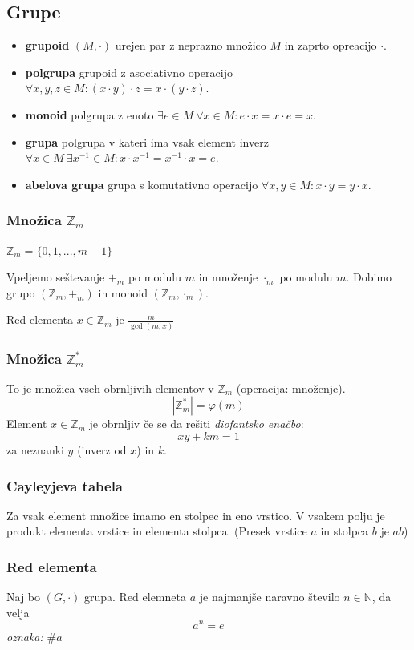 \begin{multicols}{4}
\subsection*{Grupe}
\begin{itemize}
    \item \textbf{grupoid} $(M, \cdot)$ urejen par z neprazno množico $M$ in zaprto opreacijo $\cdot$.
    \item \textbf{polgrupa} grupoid z asociativno operacijo $ \forall x,y,z \in M : (x\cdot y)\cdot z = x\cdot (y\cdot z)$.
    \item \textbf{monoid} polgrupa z enoto $ \exists e \in M \ \forall x \in M : e\cdot x = x\cdot e = x$.
    \item \textbf{grupa} polgrupa v kateri ima vsak element inverz $ \forall x \in M \ \exists x^{-1} \in M : x\cdot x^{-1} = x^{-1}\cdot x = e$.
    \item \textbf{abelova grupa} grupa s komutativno operacijo $ \forall x,y \in M  : x\cdot y = y\cdot x$.
\end{itemize} 

\subsubsection{Množica $\mathbb{Z}_m$}
$\mathbb{Z}_m = \{0,1,...,m-1\}$

Vpeljemo seštevanje $+_m$ po modulu $m$ in množenje $\cdot_m$ po modulu $m$. 
Dobimo grupo $(\mathbb{Z}_m, +_m)$ in monoid $(\mathbb{Z}_m, \cdot_m)$.

Red elementa $x\in \mathbb{Z}_m$ je $\frac{m}{\gcd(m,x)}$

\subsubsection{Množica $\mathbb{Z}_m^*$}
To je množica vseh obrnljivih elementov v $\mathbb{Z}_m$ (operacija: množenje).
\[|\mathbb{Z}^*_m| = \varphi(m)\]
Element $x\in \mathbb{Z}_m$ je obrnljiv če se da rešiti \emph{diofantsko enačbo}:
\[ xy + km = 1\]
za neznanki $y$ (inverz od $x$) in $k$.

\subsubsection{Cayleyjeva tabela}
Za vsak element množice imamo en stolpec in eno vrstico. V vsakem polju je produkt elementa vrstice in elementa stolpca.
(Presek vrstice $a$ in stolpca $b$ je $ab$)

\subsubsection{Red elementa}
Naj bo $(G,\cdot)$ grupa. Red elemneta $a$ je najmanjše naravno število $n \in \mathbb{N}$, da velja
\[a^n = e\]
\textit{oznaka:} $\#a$


\end{multicols}
